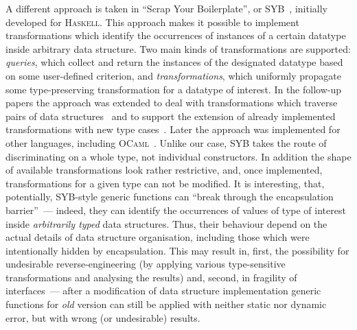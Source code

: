 A different approach is taken in ``Scrap Your Boilerplate'', or SYB~\cite{SYB}, initially developed for \textsc{Haskell}. This approach makes it
possible to implement transformations which identify the occurrences of instances of a certain datatype inside arbitrary data structure. Two main
kinds of transformations are supported: \emph{queries}, which collect and return the instances of the designated datatype based on some user-defined
criterion, and \emph{transformations}, which uniformly propagate some type-preserving transformation for a datatype of interest. In the follow-up papers
the approach was extended to deal with transformations which traverse pairs of data structures~\cite{SYB1} and to support the extension of already implemented
transformations with new type cases~\cite{SYB2}. Later the approach was implemented  for other languages, including \textsc{OCaml}~\cite{SYBOCaml,Staged}.
Unlike our case, SYB takes the route of discriminating on a whole type, not individual constructors. In addition the shape of available transformations look rather
restrictive, and, once implemented, transformations for a given type can not be modified. It is interesting, that, potentially, SYB-style generic functions
can ``break through the encapsulation barrier''~--- indeed, they can identify the occurrences of values of type of interest inside \emph{arbitrarily typed}
data structures. Thus, their behaviour depend on the actual details of data structure organisation, including those which were intentionally hidden by encapsulation.
This may result in, first, the possibility for undesirable reverse-engineering (by applying various type-sensitive transformations and analysing the results) and,
second, in fragility of interfaces~--- after a modification of data structure implementation generic functions for \emph{old} version can still be applied with
neither static nor dynamic error, but with wrong (or undesirable) results. 

